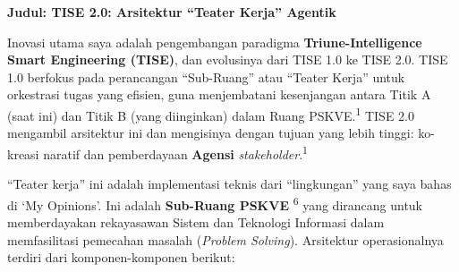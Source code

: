 \documentclass[
  letterpaper,
  DIV=11,
  numbers=noendperiod]{scrreprt}
\begin{document}
\textbf{Judul: TISE 2.0: Arsitektur ``Teater Kerja'' Agentik}

Inovasi utama saya adalah pengembangan paradigma
\textbf{Triune-Intelligence Smart Engineering (TISE)}, dan evolusinya
dari TISE 1.0 ke TISE 2.0. TISE 1.0 berfokus pada perancangan
``Sub-Ruang'' atau ``Teater Kerja'' untuk orkestrasi tugas yang efisien,
guna menjembatani kesenjangan antara Titik A (saat ini) dan Titik B
(yang diinginkan) dalam Ruang PSKVE.\textsuperscript{1} TISE 2.0
mengambil arsitektur ini dan mengisinya dengan tujuan yang lebih tinggi:
ko-kreasi naratif dan pemberdayaan \textbf{Agensi}
\emph{stakeholder}.\textsuperscript{1}

``Teater kerja'' ini adalah implementasi teknis dari ``lingkungan'' yang
saya bahas di `My Opinions'. Ini adalah \textbf{Sub-Ruang PSKVE}
\textsuperscript{6} yang dirancang untuk memberdayakan rekayasawan
Sistem dan Teknologi Informasi dalam memfasilitasi pemecahan masalah
(\emph{Problem Solving}). Arsitektur operasionalnya terdiri dari
komponen-komponen berikut:
\end{document}
